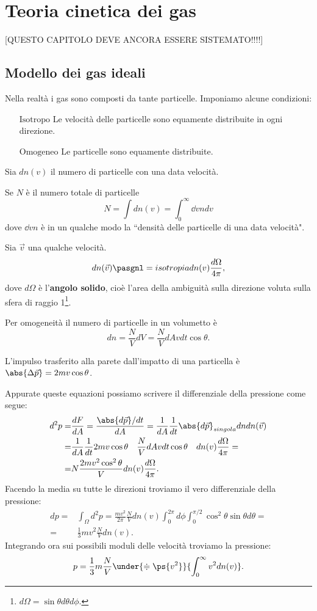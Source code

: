 \chapter{Teoria cinetica dei gas}

[QUESTO CAPITOLO DEVE ANCORA ESSERE SISTEMATO!!!!]

\section{Modello dei gas ideali}
Nella realt\`a i gas sono composti da tante particelle. Imponiamo alcune condizioni:
\setlength{\leftmargini}{0cm}
\begin{itemize}
\item[$\boxed{\text{Isotropo}}$] Le velocit\`a delle particelle sono equamente distribuite in ogni direzione.
\item[$\boxed{\text{Omogeneo}}$] Le particelle sono equamente distribuite.
\end{itemize}
\setlength{\leftmargini}{0.5cm}
Sia $dn(v)$ il numero di particelle con una data velocit\`a.
\begin{remark}
Se $N$ \`e il numero totale di particelle
\[N=\int dn(v)=\int_0^\infty \dd vndv\]
dove $\dd vn$ \`e in un qualche modo la ``densit\`a delle particelle di una data velocit\`a".
\end{remark}
\begin{remark}
Sia $\vec v$ una qualche velocit\`a.
\[dn(\vec v)\pasgnl={isotropia}dn(v)\frac{d\Omega}{4\pi},\]
dove $d\Omega$ \`e l'\textbf{angolo solido}, cio\`e l'area della ambiguit\`a sulla direzione voluta sulla sfera di raggio 1\footnote{$d\Omega=\sin\theta d\theta d\phi$.}.
\end{remark}

\begin{remark}
Per omogeneit\`a il numero di particelle in un volumetto \`e
\[dn=\frac NVdV=\frac NV dAvdt\cos\theta.\]
\end{remark}

\begin{remark}
L'impulso trasferito alla parete dall'impatto di una particella \`e $\abs{\Delta \vec p}=2mv\cos \theta$.
\end{remark}
\noindent Appurate queste equazioni possiamo scrivere il differenziale della pressione come segue:
\begin{align*}
d^2p=&\frac{dF}{dA}=\frac{\abs{d\vec p}/dt}{dA}=\frac1{dA}\frac1{dt}\abs{d\vec p}_{singola}dn dn(\vec v)\\
=&\frac1{dA}\frac1{dt}{2mv\cos \theta}\quad{\frac{N}V dAvdt\cos \theta}\quad{dn(v)\frac{d\Omega}{4\pi}}=\\
=&N\frac{2mv^2\cos^2\theta}Vdn(v)\frac{d\Omega}{4\pi}.
\end{align*}
Facendo la media su tutte le direzioni troviamo il vero differenziale della pressione:
\begin{align*}
dp=&\int_\Omega d^2p=\frac{mv^2}{2\pi}\frac NVdn(v)\int_0^{2\pi}d\phi\int_0^{\pi/2}\cos^2\theta\sin\theta d\theta=\\
=&\frac13mv^2\frac NVdn(v).
\end{align*}
Integrando ora sui possibili moduli delle velocit\`a troviamo la pressione:
\[p=\frac13m\frac NV\under{\doteqdot \ps{v^2}}{\int_0^\infty v^2dn(v)}.\]

